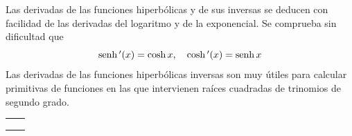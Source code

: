Las derivadas de las funciones hiperbólicas y de sus inversas se deducen
con facilidad de las derivadas del logaritmo y de la exponencial.
Se comprueba sin dificultad que 
\[
\operatorname{senh}\mbox{$^{\prime}$}(x)=\cosh x,\quad\cosh\mbox{$^{\prime}$}(x)=\operatorname{senh} x
\]
Las derivadas de las funciones hiperbólicas inversas son muy útiles
para calcular primitivas de funciones en las que intervienen raíces
cuadradas de trinomios de segundo grado. 
\begin{center}
\begin{tabular}{|c|c|}
\hline 
\raisebox{1em}{$\rule{0mm}{9mm}\dis\argsenh(x)=\log\left(x+\sqrt{x^{2}+1}\right)$}  &
\raisebox{1em}{$\rule{0mm}{9mm}\dis\argsenh\tlo(x)=\frac{1}{\sqrt{x^{2}+1}}$} \tabularnewline
\hline 
\raisebox{1em}{$\rule{0mm}{9mm}\dis\argcosh(x)=\log\left(x+\sqrt{x^{2}-1}\right)\quad x>1$}  &
\raisebox{1em}{$\rule{0mm}{9mm}\dis\argcosh\tlo(x)=\frac{1}{\sqrt{x^{2}-1}}$} \tabularnewline
\hline 
\raisebox{1em}{$\rule{0mm}{9mm}\dis\argcosech(x)=\argsenh\left(\dfrac{1}{x}\right)\quad x\neq0$}  &
\raisebox{1em}{$\rule{0mm}{9mm}\dis\argcosech\tlo(x)=\frac{-1}{\abs{x}\sqrt{x^{2}+1}}$} \tabularnewline
\hline 
\raisebox{1em}{$\rule{0mm}{9mm}\dis\argsech(x)=\argcosh\left(\dfrac{1}{x}\right)\quad0<x<1$}  &
\raisebox{1em}{$\rule{0mm}{9mm}\dis\argsech\tlo(x)=\frac{-1}{x\sqrt{1-x^{2}}}$} \tabularnewline
\hline 
\end{tabular}
\par\end{center}

